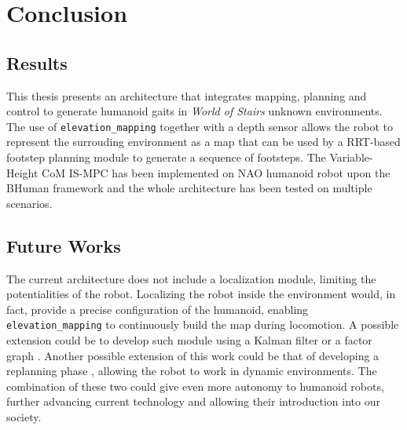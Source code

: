 \chapter{Conclusion}
\label{ch:conclusion}
\section{Results}
This thesis presents an architecture that integrates mapping, planning and 
control to generate humanoid gaits in \textit{World of Stairs} unknown 
environments. The use of \texttt{elevation\_mapping}
\cite{Fankhauser2018ProbabilisticTerrainMapping} together with a depth
sensor allows the robot to represent the surrouding environment as a map that
can be used by a RRT-based footstep planning module \cite{ECC19}
to generate a sequence
of footsteps. The Variable-Height CoM IS-MPC \cite{SYROCO18} 
has been implemented on NAO
humanoid robot upon the BHuman framework and the whole architecture has been
tested on multiple scenarios.

\section{Future Works}
The current architecture does not include a localization module, limiting the
potentialities of the robot. Localizing the robot inside the environment would,
in fact, provide a precise configuration of the humanoid, enabling 
\texttt{elevation\_mapping} to continuously build the map during locomotion.
A possible extension could be to develop such module using a Kalman filter
\cite{Bloesch2013StateEstimationLeggedRobots} or a factor graph
\cite{Wisth2019PreintegratedVelocityBiasEstimation}.
Another possible extension of this work could be that of developing a replanning
phase \cite{Griffin2019FootstepPlanningRoughTerrain}, allowing the robot to
work in dynamic environments. The combination of these two could give even
more autonomy to humanoid robots, further advancing current technology and
allowing their introduction into our society.

